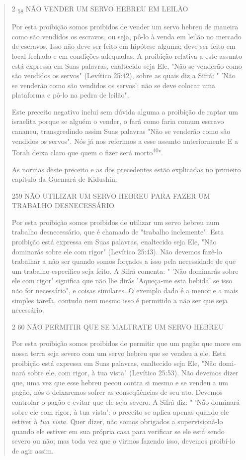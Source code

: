 \begin{quote}
2 \textsubscript{58} NÃO VENDER UM SERVO HEBREU EM LEILÃO

Por esta proibição somos proibidos de vender um servo hebreu de maneira
como são vendidos os escravos, ou seja, pô-lo à venda em leilão no
mercado de escravos. Isso não deve ser feito em hipótese alguma; deve
ser fei­to em local fechado e em condições adequadas. A proibição
relativa a este as­sunto está expressa em Suas palavras, enaltecido seja
Ele, "Não se venderão co­mo são vendidos os servos" (Levítico 25:42),
sobre as quais diz a Sifrá: " 'Não se venderão como são vendidos os
servos': não se deve colocar uma platafor­ma e pô-lo na pedra de
leilão".

Este preceito negativo inclui sem dúvida alguma a proibição de rap­tar
um israelita porque se alguém o vender, o fará como faria comum escravo
cananeu, transgredindo assim Suas palavras "Não se venderão como são
vendi­dos os servos". Nós já nos referimos a esse assunto anteriormente
E a Torah deixa claro que quem o fizer será morto\textsuperscript{40}".

As normas deste preceito e as dos precedentes estão explicadas no
primeiro capítulo da Guemará de Kidushin.

259 NÃO UTILIZAR UM SERVO HEBREU PARA FAZER UM TRABALHO DESNECESSÁRIO

Por esta proibição somos proibidos de utilizar um servo hebreu num
trabalho desnecessário, que é chamado de "trabalho inclemente". Esta
proibi­ção está expressa em Suas palavras, enaltecido seja Ele, "Não
dominarás sobre ele com rigor" (Levítico 25:43). Não devemos fazê-lo
trabalhar a não ser quan­do somos forçados a isso pela necessidade de
que um trabalho específico seja feito. A Sifrá comenta: " 'Não dominarás
sobre ele com rigor' significa que não lhe dirás 'Aqueça-me esta bebida'
se isso não for necessário", e coisas similares. O exemplo dado é a
menor e a mais simples tarefa, contudo nem mesmo isso é permitido a não
ser que seja necessário.

2 60 NÃO PERMITIR QUE SE MALTRATE UM SERVO HEBREU

Por esta proibição somos proibidos de permitir que um pagão que more em
nossa terra seja severo com um servo hebreu que se vendeu a ele. Esta
proibição está expressa em Suas palavras, enaltecido seja Ele, "Não
domi­nará sobre ele, com rigor, à tua vista" (Levítico 25:53). Não
devemos dizer que, uma vez que esse hebreu pecou contra si mesmo e se
vendeu a um pagão, nós o deixaremos sofrer as conseqüências de seu ato.
Devemos controlar o pagão e evitar que ele seja severo. A Sifrá diz: "
'Não dominará sobre ele com rigor, à tua vista': o preceito se aplica
apenas quando ele estiver à \emph{tua vista.} Quer dizer, não somos
obrigados a supervisioná-lo quando ele estiver em sua pró­pria casa para
verificar se ele está sendo severo ou não; mas toda vez que o virmos
fazendo isso, devemos proibí-lo de agir assim.
\end{quote}

